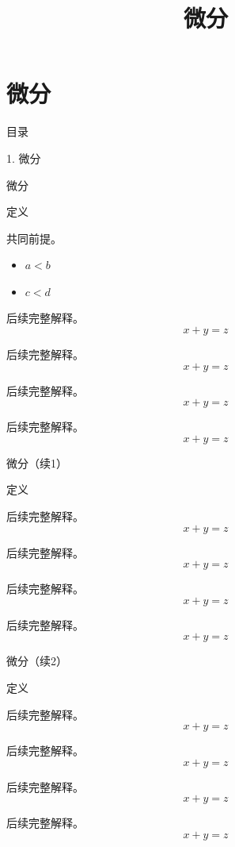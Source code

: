\documentclass[aspectratio=169,10pt,fontset=fandol]{ctexbeamer}
\title{微分}
\begin{document}
\section{微分}
\begin{frame}[t,fragile]{目录}
\normalsize
{\color{blue}\normalsize 1. 微分\par}\vspace{0.22em}
\end{frame}
\begin{frame}[t,fragile]{微分}
\footnotesize
\begin{block}{定义}
{\footnotesize
共同前提。\begin{itemize}\item $a<b$\item $c<d$\end{itemize}

后续完整解释。\[x+y=z\]

后续完整解释。\[x+y=z\]

后续完整解释。\[x+y=z\]

后续完整解释。\[x+y=z\]


}
\end{block}
\end{frame}
\begin{frame}[t,fragile]{微分（续1）}
\small
\begin{block}{定义}
{\small
后续完整解释。\[x+y=z\]

后续完整解释。\[x+y=z\]

后续完整解释。\[x+y=z\]

后续完整解释。\[x+y=z\]


}
\end{block}
\end{frame}
\begin{frame}[t,fragile]{微分（续2）}
\small
\begin{block}{定义}
{\small
后续完整解释。\[x+y=z\]

后续完整解释。\[x+y=z\]

后续完整解释。\[x+y=z\]

后续完整解释。\[x+y=z\]


}
\end{block}
\end{frame}
\end{document}
